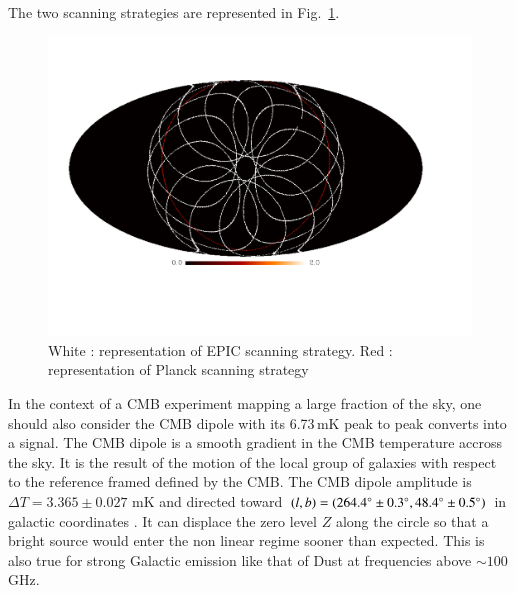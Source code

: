 The two scanning strategies are represented in Fig.~\ref{fig:strat-polsat-Planck}.

\begin{figure}[h]
  \includegraphics[clip,angle=0,width=\columnwidth]{Figures/plot_mollweide.pdf}
  \caption{White : representation of EPIC scanning strategy. Red : representation of Planck scanning strategy }
  \label{fig:strat-polsat-Planck}
\end{figure}

In the context of a CMB experiment mapping a large fraction of the sky, one should also consider the CMB dipole  with its 6.73\,mK peak to peak \citep{2015IJMPD..2430004B} converts into a  signal. The CMB dipole is a smooth gradient in the CMB temperature accross the sky. It is the result of the motion of the local group of galaxies with respect to the reference framed defined by the CMB. The CMB dipole amplitude is $\Delta T = 3.365 \pm 0.027$ mK and directed toward $(l,b) = (264.4 \degree \pm 0.3 \degree , 48.4 \degree \pm 0.5 \degree)$ in galactic coordinates \citep{1993ApJ...419....1K}. It can displace the zero level $Z$ along the circle so that a bright source would enter the non linear regime sooner than expected. This is also true for strong Galactic emission like that of Dust at frequencies above $\sim 100$\,GHz. 












